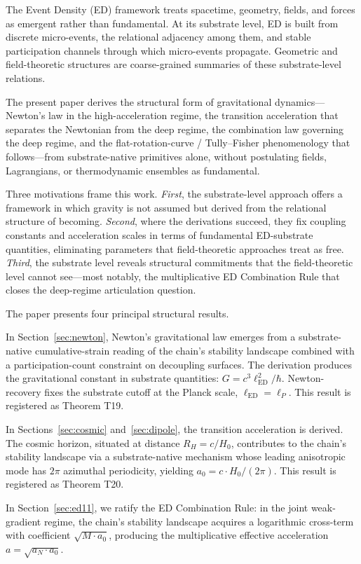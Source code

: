\documentclass[11pt,a4paper]{article}
\begin{document}
The Event Density (ED) framework treats spacetime, geometry, fields, and forces as emergent rather than fundamental. At its substrate level, ED is built from discrete micro-events, the relational adjacency among them, and stable participation channels through which micro-events propagate. Geometric and field-theoretic structures are coarse-grained summaries of these substrate-level relations.

The present paper derives the structural form of gravitational dynamics---Newton's law in the high-acceleration regime, the transition acceleration that separates the Newtonian from the deep regime, the combination law governing the deep regime, and the flat-rotation-curve / Tully--Fisher phenomenology that follows---from substrate-native primitives alone, without postulating fields, Lagrangians, or thermodynamic ensembles as fundamental.

Three motivations frame this work. \emph{First}, the substrate-level approach offers a framework in which gravity is not assumed but derived from the relational structure of becoming. \emph{Second}, where the derivations succeed, they fix coupling constants and acceleration scales in terms of fundamental ED-substrate quantities, eliminating parameters that field-theoretic approaches treat as free. \emph{Third}, the substrate level reveals structural commitments that the field-theoretic level cannot see---most notably, the multiplicative ED Combination Rule that closes the deep-regime articulation question.

The paper presents four principal structural results.

In Section~\ref{sec:newton}, Newton's gravitational law emerges from a substrate-native cumulative-strain reading of the chain's stability landscape combined with a participation-count constraint on decoupling surfaces. The derivation produces the gravitational constant in substrate quantities: $G = c^3 \ell_{\mathrm{ED}}^2 / \hbar$. Newton-recovery fixes the substrate cutoff at the Planck scale, $\ell_{\mathrm{ED}} = \ell_P$. This result is registered as Theorem T19.

In Sections~\ref{sec:cosmic} and~\ref{sec:dipole}, the transition acceleration is derived. The cosmic horizon, situated at distance $R_H = c/H_0$, contributes to the chain's stability landscape via a substrate-native mechanism whose leading anisotropic mode has $2\pi$ azimuthal periodicity, yielding $a_0 = c \cdot H_0 / (2\pi)$. This result is registered as Theorem T20.

In Section~\ref{sec:ed11}, we ratify the ED Combination Rule: in the joint weak-gradient regime, the chain's stability landscape acquires a logarithmic cross-term with coefficient $\sqrt{M\cdot a_0}$, producing the multiplicative effective acceleration $a = \sqrt{a_N \cdot a_0}$.
\end{document}
